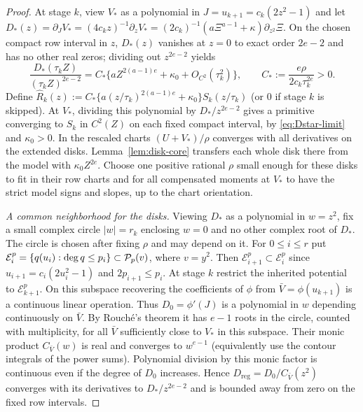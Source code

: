 \begin{proof}
At stage $k$, view $V_*$ as a polynomial in $J=u_{k+1}=c_k(2z^2-1)$ and let $D_*(z)=\partial_J V_*=(4c_k z)^{-1}\partial_z V_* = (2c_k)^{-1}(a\Xi^{a-1}+\kappa)\partial_{z^2}\Xi$. On the chosen compact row interval in $z$, $D_*(z)$ vanishes at $z=0$ to exact order $2e-2$ and has no other real zeros; dividing out $z^{2e-2}$ yields
\begin{equation}\label{eq:Dstar-limit}
  \frac{D_*(\tau_k Z)}{(\tau_k Z)^{2e-2}}
  = C_*\bigl\{a Z^{2(a-1)e} + \kappa_0 + O_{C^2}(\tau_k^2)\bigr\}, \qquad
  C_* := \frac{e\rho}{2c_k\tau_k^{2e}} > 0.
\end{equation}
Define $\widehat{R}_k(z):=C_*\{a(z/\tau_k)^{2(a-1)e}+\kappa_0\}S_k(z/\tau_k)$ (or $0$ if stage $k$ is skipped). At $V_*$, dividing this polynomial by $D_*/z^{2e-2}$ gives a primitive converging to $S_k$ in $C^2(Z)$ on each fixed compact interval, by \eqref{eq:Dstar-limit} and $\kappa_0>0$. In the rescaled charts $(U+V_*)/\rho$ converges with all derivatives on the extended disks. Lemma~\ref{lem:disk-core} transfers each whole disk there from the model with $\kappa_0 Z^{2e}$. Choose one positive rational $\rho$ small enough for these disks to fit in their row charts and for all compensated moments at $V_*$ to have the strict model signs and slopes, up to the chart orientation.

\emph{A common neighborhood for the disks.} Viewing $D_*$ as a polynomial in $w=z^2$, fix a small complex circle $|w|=r_k$ enclosing $w=0$ and no other complex root of $D_*$. The circle is chosen after fixing $\rho$ and may depend on it. 
For $0\le i\le r$ put $\mathcal E_i^p=\{q(u_i):\deg q\le p_i\}\subset\mathcal{P}_p(v)$, where $v=y^2$. Then $\mathcal E_{i+1}^p\subset\mathcal E_i^p$ since $u_{i+1}=c_i(2u_i^2-1)$ and $2p_{i+1}\le p_i$. At stage $k$ restrict the inherited potential to $\mathcal E_{k+1}^p$. On this subspace recovering the coefficients of $\phi$ from $\bar V=\phi(u_{k+1})$ is a continuous linear operation. Thus $D_0=\phi'(J)$ is a polynomial in $w$ depending continuously on $\bar V$. By Rouch\'e's theorem it has $e-1$ roots in the circle, counted with multiplicity, for all $\bar V$ sufficiently close to $V_*$ in this subspace. Their monic product $C_{\bar V}(w)$ is real and converges to $w^{e-1}$ (equivalently use the contour integrals of the power sums). Polynomial division by this monic factor is continuous even if the degree of $D_0$ increases. Hence $D_{\mathrm{reg}}=D_0/C_{\bar V}(z^2)$ converges with its derivatives to $D_*/z^{2e-2}$ and is bounded away from zero on the fixed row intervals.


\end{proof}
